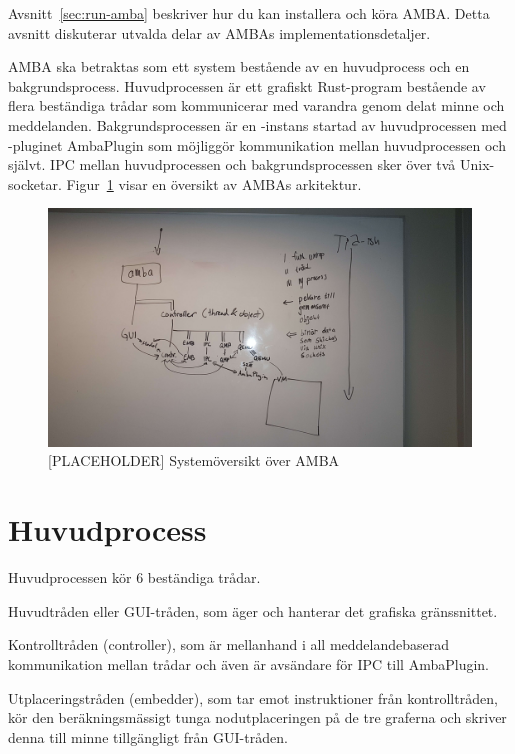 Avsnitt~\ref{sec:run-amba} beskriver hur du kan installera och köra AMBA. Detta
avsnitt diskuterar utvalda delar av AMBAs implementationsdetaljer.

AMBA ska betraktas som ett system bestående av en huvudprocess och en
bakgrundsprocess. Huvudprocessen är ett grafiskt Rust-program bestående av flera
beständiga trådar som kommunicerar med varandra genom delat minne och
meddelanden. Bakgrundsprocessen är en \stoe{}-instans startad av huvudprocessen
med \stoe{}-pluginet AmbaPlugin som möjliggör kommunikation mellan
huvudprocessen och \stoe{} självt. IPC mellan huvudprocessen och
bakgrundsprocessen sker över två Unix-socketar. Figur~\ref{fig:arkitektur} visar
en översikt av AMBAs arkitektur.

\begin{figure}[h]
    \centering
    \includegraphics[width=\textwidth]{figures/arkitektur.jpg}
    \caption{[PLACEHOLDER] Systemöversikt över AMBA}\label{fig:arkitektur}
\end{figure}

\section{Huvudprocess}

Huvudprocessen kör 6 beständiga trådar.

Huvudtråden eller GUI-tråden, som äger och hanterar det grafiska gränssnittet.

Kontrolltråden (controller), som är mellanhand i all meddelandebaserad
kommunikation mellan trådar och även är avsändare för IPC till AmbaPlugin.

Utplaceringstråden (embedder), som tar emot instruktioner från kontrolltråden,
kör den beräkningsmässigt tunga nodutplaceringen på de tre graferna och skriver
denna till minne tillgängligt från GUI-tråden.

